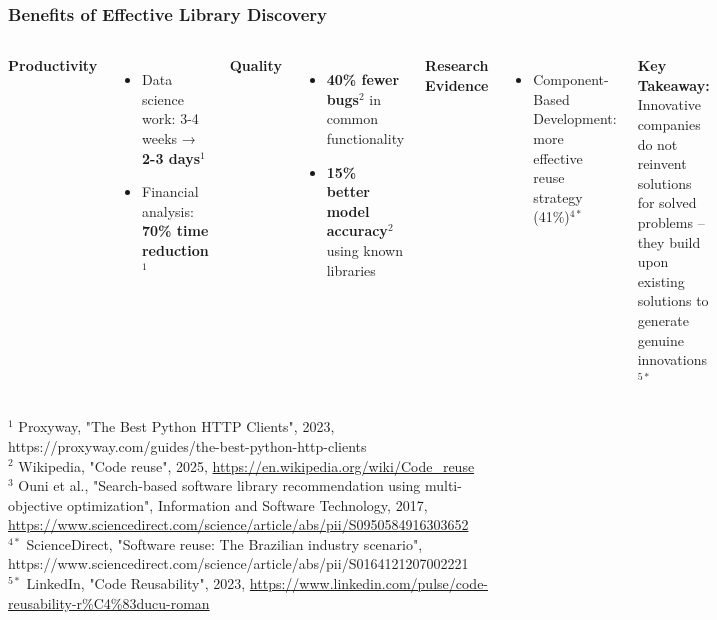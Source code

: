 \documentclass{beamer}
\begin{document}
\begin{frame}
\frametitle{Benefits of Effective Library Discovery}
\begin{columns}[T]
\textbf{Productivity}
\begin{itemize}
\item Data science work: 3-4 weeks → \textbf{2-3 days}$^{1}$
\item Financial analysis: \textbf{70\% time reduction}$^{1}$
\end{itemize}

\textbf{Quality}
\begin{itemize}
\item \textbf{40\% fewer bugs}$^{2}$ in common functionality
\item \textbf{15\% better model accuracy}$^{2}$ using known libraries
\end{itemize}

\textbf{Research Evidence}
\begin{itemize}
\item Component-Based Development: more effective reuse strategy (41\%)$^{4*}$
\end{itemize}

\vspace{0.2cm}
\textbf{Key Takeaway:} Innovative companies do not reinvent solutions for solved problems -- they build upon existing solutions to generate genuine innovations$^{5*}$
\end{columns}

\vspace{0.2cm}
{\tiny
$^{1}$ Proxyway, "The Best Python HTTP Clients", 2023, https://proxyway.com/guides/the-best-python-http-clients\\
$^{2}$ Wikipedia, "Code reuse", 2025, \url{https://en.wikipedia.org/wiki/Code_reuse}\\
$^{3}$ Ouni et al., "Search-based software library recommendation using multi-objective optimization", Information and Software Technology, 2017, \url{https://www.sciencedirect.com/science/article/abs/pii/S0950584916303652}\\
$^{4*}$ ScienceDirect, "Software reuse: The Brazilian industry scenario", https://www.sciencedirect.com/science/article/abs/pii/S0164121207002221\\
$^{5*}$ LinkedIn, "Code Reusability", 2023, \url{https://www.linkedin.com/pulse/code-reusability-r\%C4\%83ducu-roman}
}
\end{frame}
\end{document}
